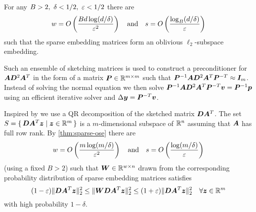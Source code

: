 \begin{theorem}  \label{thm:sparse-ose}
For any \(B > 2, \ \delta < 1/2, \ \varepsilon < 1/2\) there are
\[ w = O \left( \frac{B d \log(d/\delta)}{\varepsilon^2} \right) \quad \text{and} \quad s = O \left( \frac{\log_B(d/\delta)}{\varepsilon} \right)\]
such that the sparse embedding matrices form an oblivious \(\ell_2\)-subspace embedding.
\end{theorem}

Such an ensemble of sketching matrices is used to construct a preconditioner for \(\bm{A} \bm{D}^2 \bm{A}^T\) in the form of a matrix \(\bm{P} \in \mathbb{R}^{m \times m}\) such that
\( \bm{P}^{-1} \bm{A} \bm{D}^2 \bm{A}^T \bm{P}^{-T} \approx \bm{I}_m \).
Instead of solving the normal equation we then solve
\( \bm{P}^{-1} \bm{A} \bm{D}^2 \bm{A}^T \bm{P}^{-T} \bm{v} = \bm{P}^{-1} \bm{p} \)
using an efficient iterative solver and \(\Delta\bm{y} = \bm{P}^{-T} \bm{v}\).

Inspired by \textcite{Avron-FasterRandomizedInfeasibleIPMs} we use a QR decomposition of the sketched matrix \(\bm{D}\bm{A}^T\).
The set \(S = \set{ \bm{D}\bm{A}^T \bm{z} | \bm{z} \in \mathbb{R}^m}\) is a \(m\)-dimensional subspace of \(\mathbb{R}^n\) assuming that \(\bm{A}\) has full row rank.
By \cref{thm:sparse-ose} there are
\[ w = O \left(  \frac{m \log(m/\delta)}{\varepsilon^2}  \right) \quad \text{and} \quad s = O \left(  \frac{\log(m/\delta)}{\varepsilon}  \right)\]
(using a fixed \(B > 2\)) such that \(\bm{W} \in \mathbb{R}^{w \times n}\) drawn from the corresponding probability distribution of sparse embedding matrices satisfies
\begin{equation}
  (1-\varepsilon) \lVert \bm{D}\bm{A}^T \bm{z} \rVert_2^2 \leq \lVert \bm{W}\bm{D}\bm{A}^T \bm{z} \rVert_2^2 \leq (1+\varepsilon)\lVert \bm{D}\bm{A}^T \bm{z} \rVert_2^2 \quad \forall \bm{z} \in \mathbb{R}^m \label{eqn:ose-for-DAT}
\end{equation}
with high probability \(1 - \delta\).

